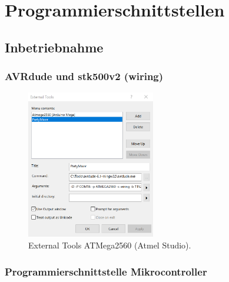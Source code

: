 
\section{Programmierschnittstellen}\label{Appendix:Programmierschnittstellen}
\subsection{Inbetriebnahme}


\subsubsection{AVRdude und stk500v2 (wiring)}\mbox{}

\begin{figure}[H]
	\centering
	\includegraphics[width=0.5\textwidth]{graphics/AtmelStudio_External_Tools}
	\caption{External Tools ATMega2560 (Atmel Studio).}
	\label{fig:AtmelStudio_External_Tools}
\end{figure}

\subsubsection{Programmierschnittstelle Mikrocontroller}\label{Appendix:Handshake_uC}

